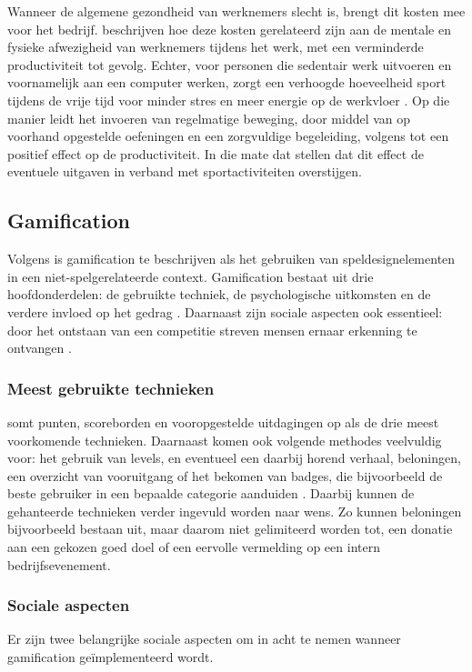 Wanneer de algemene gezondheid van werknemers slecht is, brengt dit kosten mee voor het bedrijf. \textcite{Sjoegaard2016} beschrijven hoe deze kosten gerelateerd zijn aan de mentale en fysieke afwezigheid van werknemers tijdens het werk, met een verminderde productiviteit tot gevolg. Echter, voor personen die sedentair werk uitvoeren en voornamelijk aan een computer werken, zorgt een verhoogde hoeveelheid sport tijdens de vrije tijd voor minder stres en meer energie op de werkvloer \autocite{Hansen2009}. Op die manier leidt het invoeren van regelmatige beweging, door middel van op voorhand opgestelde oefeningen en een zorgvuldige begeleiding, volgens \textcite{Cancelliere2011} tot een positief effect op de productiviteit. In die mate dat \textcite{Sjoegaard2016} stellen dat dit effect de eventuele uitgaven in verband met sportactiviteiten overstijgen.

\subsection{Gamification}

Volgens \textcite{Deterding2011} is gamification te beschrijven als het gebruiken van speldesignelementen in een niet-spelgerelateerde context. Gamification bestaat uit drie hoofdonderdelen: de gebruikte techniek, de psychologische uitkomsten en de verdere invloed op het gedrag \autocite{Hamari2014}. Daarnaast zijn sociale aspecten ook essentieel: door het ontstaan van een competitie streven mensen ernaar erkenning te ontvangen \autocite{Hamari2013}.

\subsubsection{Meest gebruikte technieken}
\textcite{Hamari2014} somt punten, scoreborden en vooropgestelde uitdagingen op als de drie meest voorkomende technieken. Daarnaast komen ook volgende methodes veelvuldig voor: het gebruik van levels, en eventueel een daarbij horend verhaal, beloningen, een overzicht van vooruitgang of het bekomen van badges, die bijvoorbeeld de beste gebruiker in een bepaalde categorie aanduiden \autocite{Dong2012,Flatla2011,Li2012}.
Daarbij kunnen de gehanteerde technieken verder ingevuld worden naar wens. Zo kunnen beloningen bijvoorbeeld bestaan uit, maar daarom niet gelimiteerd worden tot, een donatie aan een gekozen goed doel of een eervolle vermelding op een intern bedrijfsevenement.

\subsubsection{Sociale aspecten}
Er zijn twee belangrijke sociale aspecten om in acht te nemen wanneer gamification geïmplementeerd wordt.

